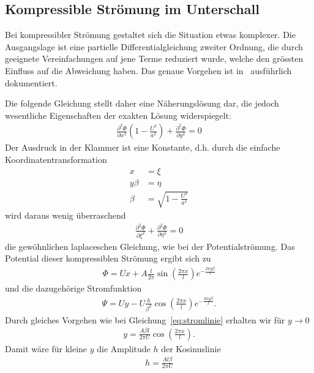 \subsection{Kompressible Strömung im Unterschall}
Bei kompressibler Strömung gestaltet sich die Situation etwas komplexer.
Die Ausgangslage ist eine partielle Differentialgleichung zweiter Ordnung,
die durch geeignete Vereinfachungen auf jene Terme reduziert wurde, 
welche den grössten Einfluss auf die Abweichung haben.
Das genaue Vorgehen ist in~\cite{Ackeret1928} ausführlich dokumentiert.

Die folgende Gleichung stellt daher eine Näherungslösung dar,
die jedoch wesentliche Eigenschaften der exakten Lösung widerspiegelt:
\begin{align}
    \frac{\partial^2 \Phi}{\partial x^2} 
    \left(1-\frac{U^2}{a^2}\right)
    +
    \frac{\partial^2 \Phi}{\partial y^2}
    =
    0\label{eq:kompressible_stroemung}
\end{align}
Der Ausdruck in der Klammer ist eine Konstante, d.h.
durch die einfache Koordinatentransformation
\begin{align*}
    x 
    &=
    \xi \\
    y \beta
    &=
    \eta \\
    \beta
    &=
    \sqrt{1-\frac{U^2}{a^2}}
\end{align*}
wird daraus wenig überraschend
\begin{align*}
    \frac{\partial^2 \Phi}{\partial \xi^2} 
    +
    \frac{\partial^2 \Phi}{\partial \eta^2}
    =
    0
\end{align*}
die gewöhnlichen laplaceschen Gleichung, wie
bei der Potentialströmung.
Das Potential dieser kompressiblen Strömung ergibt sich zu
\begin{align*}
    \Phi
    =
    U x + A \frac{l}{2 \pi} \sin\left(\frac{2 \pi x}{l}\right)
     e^{-\frac{2 \pi y \beta}{l}}
\end{align*}
und die dazugehörige Stromfunktion
\begin{align*}
    \Psi
    =
    U y - U \frac{h}{\beta^2} \cos\left(\frac{2\pi x}{l}\right)
     e^{-\frac{2\pi y \beta}{l}}.
\end{align*}
Durch gleiches Vorgehen wie bei Gleichung~\eqref{eq:stromlinie}
erhalten wir für $y \to 0$
\begin{align*}
    y
    =
    \frac{A \beta l}{2 \pi U} 
    \cos\left(\frac{2 \pi x}{l}\right).
\end{align*}
Damit wäre für kleine $y$ die Amplitude $h$ der Kosinuslinie
\begin{align*}
    h
    =
    \frac{A l \beta}{2 \pi U}
\end{align*}
